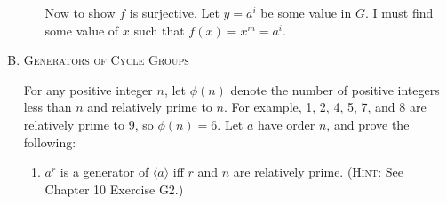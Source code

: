 \documentclass[twoside]{amsart}
\newcommand{\blank}{\vspace{5pt}}
\newcommand{\ind}{\hspace{.35in}}
\newcommand{\itm}{\blank\item}
\begin{document}
\begin{enumerate}[A.]
\begin{enumerate}[1)]
      \ind Now to show $f$ is surjective. Let $y = a^i$ be
      some value in $G$. I must find some value of $x$
      such that $f(x) = x^m = a^i$.

      
   \end{enumerate}

   \itm \textsc{Generators of Cycle Groups}

   \noindent For any positive integer $n$, let $\phi(n)$ denote the
   number of positive integers less than $n$ and relatively prime to
   $n$. For example, 1, 2, 4, 5, 7, and 8 are relatively prime to 9,
   so $\phi(n) = 6$. Let $a$ have order $n$, and prove the following:

   \begin{enumerate}
     \item $a^r$ is a generator of $\langle a \rangle$ iff $r$ and $n$
       are relatively prime. (\textsc{Hint}: See Chapter 10 Exercise G2.)
   \end{enumerate}

\end{enumerate}
\end{document}
